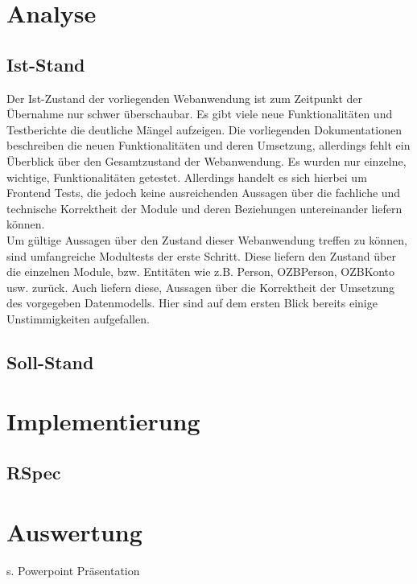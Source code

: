 \documentclass[12pt,             %
               a4paper,          %
               listof=totoc,     %
               index=totoc,      %
               bibliography=totoc,%
               oneside,         %
               BCOR1cm,          %
               english   %
               ]{scrbook}
\begin{document}
\section{Analyse}
\subsection{Ist-Stand}
Der Ist-Zustand der vorliegenden Webanwendung ist zum Zeitpunkt der Übernahme nur schwer überschaubar. Es gibt viele neue Funktionalitäten und Testberichte die deutliche Mängel aufzeigen. Die vorliegenden Dokumentationen beschreiben die neuen Funktionalitäten und deren Umsetzung, allerdings fehlt ein Überblick über den Gesamtzustand der Webanwendung. Es wurden nur einzelne, wichtige, Funktionalitäten getestet. Allerdings handelt es sich hierbei um Frontend Tests, die jedoch keine ausreichenden Aussagen über die fachliche und technische Korrektheit der Module und deren Beziehungen untereinander liefern können.\\

Um gültige Aussagen über den Zustand dieser Webanwendung treffen zu können, sind umfangreiche Modultests der erste Schritt. Diese liefern den Zustand über die einzelnen Module, bzw. Entitäten wie z.B. Person, OZBPerson, OZBKonto usw. zurück. Auch liefern diese, Aussagen über die Korrektheit der Umsetzung des vorgegeben Datenmodells. Hier sind auf dem ersten Blick bereits einige Unstimmigkeiten aufgefallen.\\

\subsection{Soll-Stand} 


\section{Implementierung}
\subsection{RSpec}

\section{Auswertung}
s. Powerpoint Präsentation
\end{document}
